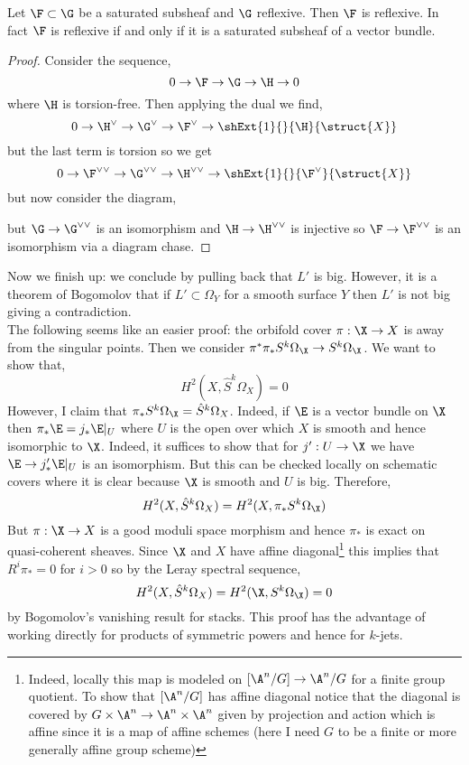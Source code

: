 \documentclass[12pt]{article}
\begin{document}
\begin{lemma}
Let $\F \subset \G$ be a saturated subsheaf and $\G$ reflexive. Then $\F$ is reflexive. In fact $\F$ is reflexive if and only if it is a saturated subsheaf of a vector bundle. 
\end{lemma}

\begin{proof}
Consider the sequence,
\[ 0 \to \F \to \G \to \H \to 0 \]
where $\H$ is torsion-free. Then applying the dual we find,
\[ 0 \to \H^\vee \to \G^\vee \to \F^\vee \to \shExt{1}{}{\H}{\struct{X}} \] 
but the last term is torsion so we get
\[ 0 \to \F^{\vee \vee} \to \G^{\vee \vee} \to \H^{\vee \vee} \to \shExt{1}{}{\F^\vee}{\struct{X}} \]
but now consider the diagram,
\begin{center}
\end{center}
but $\G \to \G^{\vee \vee}$ is an isomorphism and $\H \to \H^{\vee \vee}$ is injective so $\F \to \F^{\vee \vee}$ is an isomorphism via a diagram chase. 
\end{proof}

Now we finish up: we conclude by pulling back that $L'$ is big. However, it is a theorem of Bogomolov that if $L' \subset \Omega_Y$ for a smooth surface $Y$ then $L'$ is not big giving a contradiction. 
\bigskip\\
The following seems like an easier proof: the orbifold cover $\pi : \X \to X$ is \etale away from the singular points. Then we consider $\pi^* \pi_* S^k \Omega_{\X} \to S^k \Omega_{\X}$. We want to show that,
\[ H^2(X, \hat{S}^k \Omega_X) = 0 \]
However, I claim that $\pi_* S^k \Omega_{\X} = \hat{S}^k \Omega_X$. Indeed, if $\E$ is a vector bundle on $\X$ then $\pi_* \E = j_* \E|_U$ where $U$ is the open over which $X$ is smooth and hence isomorphic to $\X$. Indeed, it suffices to show that for $j' : U \to \X$ we have $\E \to j'_* \E|_U$ is an isomorphism. But this can be checked \etale locally on schematic covers where it is clear because $\X$ is smooth and $U$ is big. Therefore,
\[ H^2(X, \hat{S}^k \Omega_X) = H^2(X, \pi_* S^k \Omega_\X) \]  
But $\pi : \X \to X$ is a good moduli space morphism and hence $\pi_*$ is exact on quasi-coherent sheaves. Since $\X$ and $X$ have affine diagonal\footnote{Indeed, locally this map is modeled on $[\A^n / G] \to \A^n / G$ for a finite group quotient. To show that $[\A^n / G]$ has affine diagonal notice that the diagonal is covered by $G \times \A^n \to \A^n \times \A^n$ given by projection and action which is affine since it is a map of affine schemes (here I need $G$ to be a finite or more generally affine group scheme)} this implies that $R^i \pi_* = 0$ for $i > 0$ so by the Leray spectral sequence,
\[ H^2(X, \hat{S}^k \Omega_X) = H^2(\X, S^k \Omega_{\X}) = 0 \]
by Bogomolov's vanishing result for stacks. This proof has the advantage of working directly for products of symmetric powers and hence for $k$-jets. 
\end{document}
